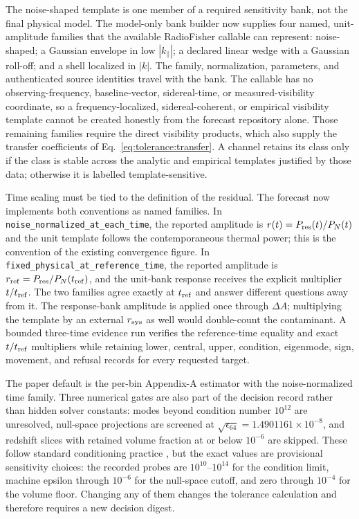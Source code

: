 The noise-shaped template is one member of a required sensitivity bank, not the
final physical model.  The model-only bank builder now supplies four named,
unit-amplitude families that the available RadioFisher callable can represent:
noise-shaped; a Gaussian envelope in low $|k_\parallel|$; a declared linear
wedge with a Gaussian roll-off; and a shell localized in $|k|$.  The family,
normalization, parameters, and authenticated source identities travel with the
bank.  The callable has no observing-frequency, baseline-vector, sidereal-time,
or measured-visibility coordinate, so a frequency-localized,
sidereal-coherent, or empirical visibility template cannot be created honestly
from the forecast repository alone.  Those remaining families require the
direct visibility products, which also supply the transfer coefficients of
Eq.~\eqref{eq:tolerance:transfer}.  A channel retains its class only if the class is
stable across the analytic and empirical templates justified by those data;
otherwise it is labelled template-sensitive.

Time scaling must be tied to the definition of the residual.  The forecast now
implements both conventions as named families.  In
\texttt{noise\_normalized\_at\_each\_time}, the reported amplitude is
$r(t)=P_{\rm res}(t)/P_N(t)$ and the unit template follows the contemporaneous
thermal power; this is the convention of the existing convergence figure.  In
\texttt{fixed\_physical\_at\_reference\_time}, the reported amplitude is
$r_{\rm ref}=P_{\rm res}/P_N(t_{\rm ref})$, and the unit-bank response receives
the explicit multiplier $t/t_{\rm ref}$.  The two families agree exactly at
$t_{\rm ref}$ and answer different questions away from it.  The response-bank
amplitude is applied once through $\Delta A$; multiplying the template by an
external $r_{\rm sys}$ as well would double-count the contaminant.  A bounded
three-time evidence run verifies the reference-time equality and exact
$t/t_{\rm ref}$ multipliers while retaining lower, central, upper, condition,
eigenmode, sign, movement, and refusal records for every requested target.

The paper default is the per-bin Appendix-A estimator with the noise-normalized time family. Three numerical gates are also part of the decision record rather than hidden solver constants: modes beyond condition number $10^{12}$ are unresolved, null-space projections are screened at $\sqrt{\epsilon_{64}}=1.4901161\times10^{-8}$, and redshift slices with retained volume fraction at or below $10^{-6}$ are skipped. These follow standard conditioning practice \cite{higham2002}, but the exact values are provisional sensitivity choices: the recorded probes are $10^{10}$--$10^{14}$ for the condition limit, machine epsilon through $10^{-6}$ for the null-space cutoff, and zero through $10^{-4}$ for the volume floor. Changing any of them changes the tolerance calculation and therefore requires a new decision digest.

